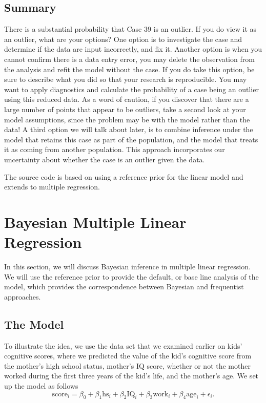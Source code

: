 \documentclass[]{book}
\theoremstyle{definition}
\theoremstyle{definition}
\theoremstyle{definition}
\theoremstyle{remark}
\begin{document}
\subsection{Summary}\label{summary}

There is a substantial probability that Case 39 is an outlier. If you do
view it as an outlier, what are your options? One option is to
investigate the case and determine if the data are input incorrectly,
and fix it. Another option is when you cannot confirm there is a data
entry error, you may delete the observation from the analysis and refit
the model without the case. If you do take this option, be sure to
describe what you did so that your research is reproducible. You may
want to apply diagnostics and calculate the probability of a case being
an outlier using this reduced data. As a word of caution, if you
discover that there are a large number of points that appear to be
outliers, take a second look at your model assumptions, since the
problem may be with the model rather than the data! A third option we
will talk about later, is to combine inference under the model that
retains this case as part of the population, and the model that treats
it as coming from another population. This approach incorporates our
uncertainty about whether the case is an outlier given the data.

The source code is based on using a reference prior for the linear model
and extends to multiple regression.

\section{Bayesian Multiple Linear
Regression}\label{bayesian-multiple-linear-regression}

In this section, we will discuss Bayesian inference in multiple linear
regression. We will use the reference prior to provide the default, or
base line analysis of the model, which provides the correspondence
between Bayesian and frequentist approaches.

\subsection{The Model}\label{the-model}

To illustrate the idea, we use the data set that we examined earlier on
kids' cognitive scores, where we predicted the value of the kid's
cognitive score from the mother's high school status, mother's IQ score,
whether or not the mother worked during the first three years of the
kid's life, and the mother's age. We set up the model as follows
\[ \text{score}_i = \beta_0 + \beta_1 \text{hs}_i + \beta_2\text{IQ}_i + \beta_3\text{work}_i + \beta_4 \text{age}_i + \epsilon_i. \]
\end{document}
